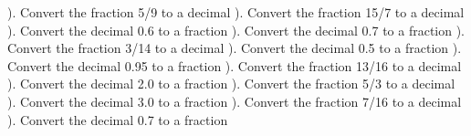 \documentclass{article}%
\begin{document}
\newline%
\newline%
). Convert the fraction 5/9 to a decimal%
\newline%
\newline%
). Convert the fraction 15/7 to a decimal%
\newline%
\newline%
). Convert the decimal 0.6 to a fraction%
\newline%
\newline%
). Convert the decimal 0.7 to a fraction%
\newline%
\newline%
). Convert the fraction 3/14 to a decimal%
\newline%
\newline%
). Convert the decimal 0.5 to a fraction%
\newline%
\newline%
). Convert the decimal 0.95 to a fraction%
\newline%
\newline%
). Convert the fraction 13/16 to a decimal%
\newline%
\newline%
). Convert the decimal 2.0 to a fraction%
\newline%
\newline%
). Convert the fraction 5/3 to a decimal%
\newline%
\newline%
). Convert the decimal 3.0 to a fraction%
\newline%
\newline%
). Convert the fraction 7/16 to a decimal%
\newline%
\newline%
). Convert the decimal 0.7 to a fraction%
\newline%
\newline%
\end{document}
